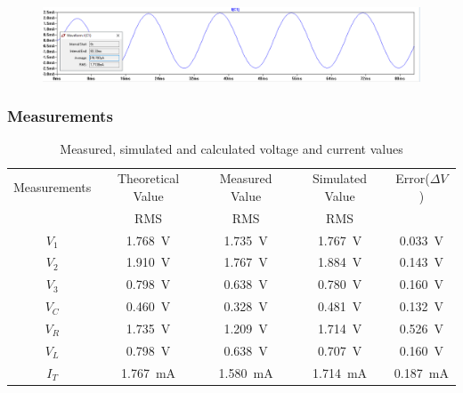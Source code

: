\documentclass[letterpaper]{article}
\begin{document}
\begin{figure}[H]
    \centering
    \includegraphics[width=\linewidth]{div-curr}
\end{figure}
\subsubsection{Measurements}
\begin{table}[H]
    \centering
    \begin{tabular}{|c|c|c|c|c|}
        \hline
        Measurements & Theoretical Value & Measured Value & Simulated Value & Error($\Delta V$) \\
         & RMS & RMS & RMS & \\\hline
        $V_1$ & \SI{1.768}{\volt} & \SI{1.735}{\volt} & \SI{1.767}{\volt} & \SI{0.033}{\volt}\\\hline 
        $V_2$ & \SI{1.910}{\volt} & \SI{1.767}{\volt} & \SI{1.884}{\volt} & \SI{0.143}{\volt}\\\hline 
        $V_3$ & \SI{0.798}{\volt} & \SI{0.638}{\volt} & \SI{0.780}{\volt} & \SI{0.160}{\volt}\\\hline 
        $V_C$ & \SI{0.460}{\volt} & \SI{0.328}{\volt} & \SI{0.481}{\volt} & \SI{0.132}{\volt}\\\hline 
        $V_R$ & \SI{1.735}{\volt} & \SI{1.209}{\volt} & \SI{1.714}{\volt} & \SI{0.526}{\volt}\\\hline 
        $V_L$ & \SI{0.798}{\volt} & \SI{0.638}{\volt} & \SI{0.707}{\volt} & \SI{0.160}{\volt}\\\hline 
        $I_T$ & \SI{1.767}{\milli\ampere} & \SI{1.580}{\milli\ampere} & \SI{1.714}{\milli\ampere} &
        \SI{0.187}{\milli\ampere}\\\hline 
    \end{tabular}
    \caption{Measured, simulated and calculated voltage and current values}
\end{table}
\end{document}
